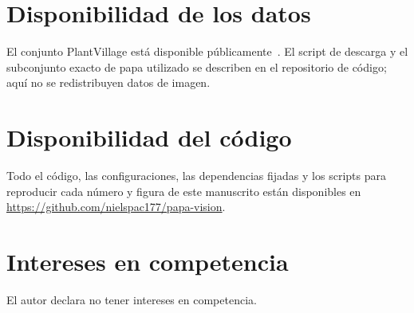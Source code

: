\documentclass[10pt]{article}
\begin{document}
\section*{Disponibilidad de los datos}
El conjunto PlantVillage está disponible públicamente~\cite{hughes2015plantvillage}. El
script de descarga y el subconjunto exacto de papa utilizado se describen en el
repositorio de código; aquí no se redistribuyen datos de imagen.

\section*{Disponibilidad del código}
Todo el código, las configuraciones, las dependencias fijadas y los scripts para
reproducir cada número y figura de este manuscrito están disponibles en
\url{https://github.com/nielspac177/papa-vision}.

\section*{Intereses en competencia}
El autor declara no tener intereses en competencia.



\end{document}
